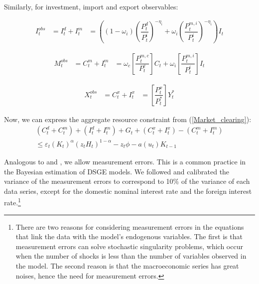\documentclass[12pt,oneside,a4paper]{article}
\begin{document}
Similarly, for investment, import and export observables:

\begin{equation}
\begin{aligned}
    I_t^{obs} &= I_t^{d} + I_t^{m} &=
    \left((1-\omega_i)\left(\dfrac{P_t^{d}}{P_t^{i}} \right)^{-\eta_i}  + \omega_i\left(\dfrac{P_t^{m,i}}{P_t^{i}} \right)^{-\eta_i}  \right)I_t
\end{aligned}
\end{equation}

\begin{equation}
\begin{aligned}
    M_t^{obs} &= C_t^{m} + I_t^{m} &=
    \omega_c\left[\dfrac{P_t^{m,c}}{P_t^{c}}\right]C_t + \omega_i\left[\dfrac{P_t^{m,i}}{P_t^{i}}\right]I_t
\end{aligned}
\end{equation}

\begin{equation}
\begin{aligned}
    X_t^{obs} &= C_t^{x} + I_t^{x} &=
    \left[\dfrac{P_t^{x}}{P_t^{*}}\right]Y_t^{*}
\end{aligned}
\end{equation}

Now, we can express the aggregate resource constraint from (\ref{Market_clearing}):
\begin{equation}
\begin{aligned}
    \left(C_t^{d} + C_t^{m} \right) + \left(I_t^{d} + I_t^{m} \right) + G_t + \left(C_t^{x} + I_t^{x} \right) - \left(C_t^{m} + I_t^{m} \right) \\
    \leq \varepsilon_{t}\left(K_{t}\right)^{\alpha}\left(z_{t} H_{t}\right)^{1-\alpha}-z_{t} \phi-a\left(u_{t}\right) K_{t-1}
\end{aligned}
\end{equation}

Analogous to \citet{Adolfson:2008} and \citet{Christiano:2011}, we allow measurement errors. This is a common practice in the Bayesian estimation of DSGE models. We followed \citet{Ninmark:2011} and calibrated the variance of the measurement errors to correspond to 10\% of the variance of each data series, except for the domestic nominal interest rate and the foreign interest rate.\footnote{There are two reasons for considering measurement errors in the equations that link the data with the model's endogenous variables. The first is that measurement errors can solve stochastic singularity problems, which occur when the number of shocks is less than the number of variables observed in the model. The second reason is that the macroeconomic series has great noises, hence the need for measurement errors.}
\end{document}
